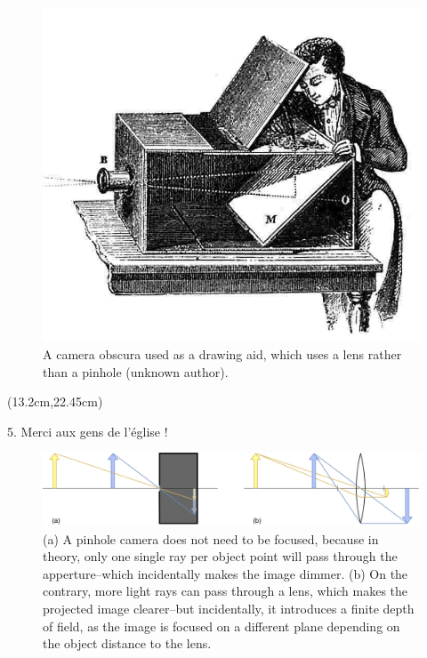 \begin{figure}[hbtp]
	\centering
	\def\svgwidth{\columnwidth}
	\fontsize{10pt}{10pt}\selectfont
	\includegraphics[width=0.8\linewidth]{"../Chap2/Figures/Camera_Obscura.jpg"}
	\caption{A camera obscura used as a drawing aid, which uses a lens rather than a pinhole (unknown author). } 
	\label{fig_camobscura}
\end{figure}

\begin{textblock*}{10cm}(13.2cm,22.45cm) %
  \begin{turn}{45} 
        \scriptsize \emojiegg
        \tiny 5. Merci aux gens de l'église ! 
        \scriptsize \emojichurch
  \end{turn}
\end{textblock*}

\begin{figure}[hbtp]
	\centering
	\def\svgwidth{\columnwidth}
	\fontsize{10pt}{10pt}\selectfont
	\includegraphics[width=1\linewidth]{"../Chap2/Figures/Pinhole_Lens.png"}
	\caption{(a) A pinhole camera does not need to be focused, because in theory, only one single ray per object point will pass through the apperture--which incidentally makes the image dimmer. (b) On the contrary, more light rays can pass through a lens, which makes the projected image clearer--but incidentally, it introduces a finite depth of field, as the image is focused on a different plane depending on the object distance to the lens.} 
	\label{fig_pinholelens}
\end{figure}


